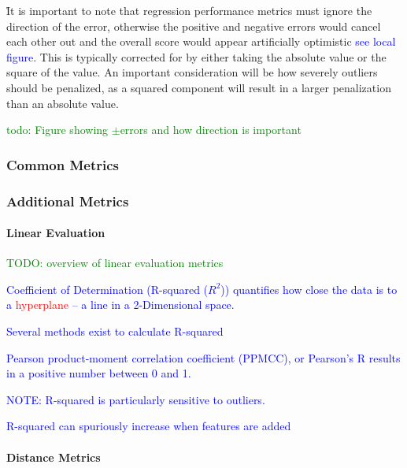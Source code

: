 \r{It is important to note that regression performance metrics must ignore the direction of the error, otherwise the positive and negative errors would cancel each other out and the overall score would appear artificially optimistic \textcolor{blue}{see local figure}. This is typically corrected for by either taking the absolute value or the square of the value. An important consideration will be how severely outliers should be penalized, as a squared component will result in a larger penalization than an absolute value.}

\textcolor{green}{todo: Figure showing $\pm$errors and how direction is important}

\subsubsection{Common Metrics}

 



\subsubsection{Additional Metrics}


\paragraph{Linear Evaluation}

\textcolor{green}{TODO: overview of linear evaluation metrics}

\textcolor{blue}{Coefficient of Determination (R-squared ($R^2$)) quantifies how close the data is to a \textcolor{red}{hyperplane} -- a line in a 2-Dimensional space.}

\textcolor{blue}{Several methods exist to calculate R-squared}

\textcolor{blue}{Pearson product-moment correlation coefficient (PPMCC), or {Pearson's R} results in a positive number between 0 and 1.}

\textcolor{blue}{NOTE: R-squared is particularly sensitive to outliers.}

\textcolor{blue}{R-squared can spuriously increase when features are added}

\paragraph{Distance Metrics}

